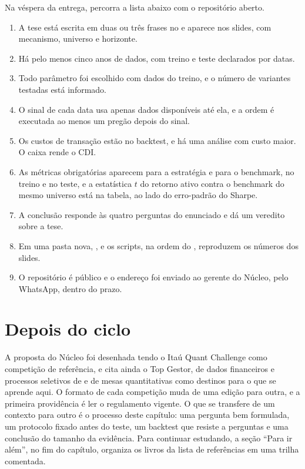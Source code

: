 Na véspera da entrega, percorra a lista abaixo com o repositório aberto.

\begin{enumerate}
  \item A tese está escrita em duas ou três frases no  e aparece nos slides, com mecanismo, universo e horizonte.
  \item Há pelo menos cinco anos de dados, com treino e teste declarados por datas.
  \item Todo parâmetro foi escolhido com dados do treino, e o número de variantes testadas está informado.
  \item O sinal de cada data usa apenas dados disponíveis até ela, e a ordem é executada ao menos um pregão depois do sinal.
  \item Os custos de transação estão no backtest, e há uma análise com custo maior. O caixa rende o CDI.
  \item As métricas obrigatórias aparecem para a estratégia e para o benchmark, no treino e no teste, e a estatística $t$ do retorno ativo contra o benchmark do mesmo universo está na tabela, ao lado do erro-padrão do Sharpe.
  \item A conclusão responde às quatro perguntas do enunciado e dá um veredito sobre a tese.
  \item Em uma pasta nova, ,  e os scripts, na ordem do , reproduzem os números dos slides.
  \item O repositório é público e o endereço foi enviado ao gerente do Núcleo, pelo WhatsApp, dentro do prazo.
\end{enumerate}

\section{Depois do ciclo}

A proposta do Núcleo foi desenhada tendo o Itaú Quant Challenge como competição de referência, e cita ainda o Top Gestor,  de dados financeiros e processos seletivos de  e de mesas quantitativas como destinos para o que se aprende aqui. O formato de cada competição muda de uma edição para outra, e a primeira providência é ler o regulamento vigente. O que se transfere de um contexto para outro é o processo deste capítulo: uma pergunta bem formulada, um protocolo fixado antes do teste, um backtest que resiste a perguntas e uma conclusão do tamanho da evidência. Para continuar estudando, a seção ``Para ir além'', no fim do capítulo, organiza os livros da lista de referências em uma trilha comentada.

